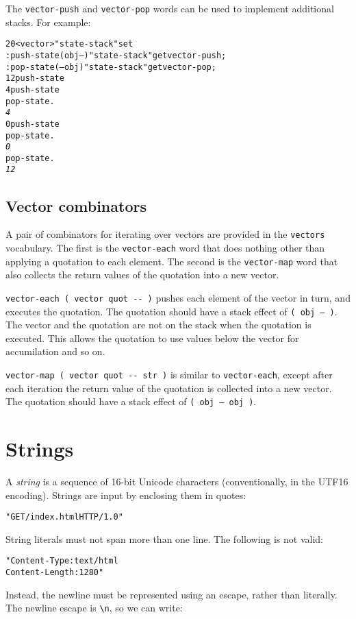 \documentclass[english]{article}
\begin{document}
The \texttt{vector-push} and \texttt{vector-pop} words can be used to implement additional stacks. For example:

\begin{alltt}
20 <vector> "state-stack" set
: push-state ( obj -- ) "state-stack" get vector-push ;
: pop-state ( -- obj ) "state-stack" get vector-pop ;
12 push-state
4 push-state
pop-state .
\emph{4}
0 push-state
pop-state .
\emph{0}
pop-state .
\emph{12}
\end{alltt}

\subsection{Vector combinators}

A pair of combinators for iterating over vectors are provided in the \texttt{vectors} vocabulary. The first is the \texttt{vector-each} word that does nothing other than applying a quotation to each element. The second is the \texttt{vector-map} word that also collects the return values of the quotation into a new vector.

\texttt{vector-each ( vector quot -{}- )} pushes each element of the vector in turn, and executes the quotation. The quotation should have a stack effect of \texttt{( obj -- )}. The vector and the quotation are not on the stack when the quotation is executed. This allows the quotation to use values below the vector for accumilation and so on.

\texttt{vector-map ( vector quot -{}- str )} is similar to \texttt{vector-each}, except after each iteration the return value of the quotation is collected into a new vector. The quotation should have a stack effect of \texttt{( obj -- obj )}.

\section{Strings}

A \emph{string} is a sequence of 16-bit Unicode characters (conventionally,
in the UTF16 encoding). Strings are input by enclosing them in quotes:

\begin{alltt}
"GET /index.html HTTP/1.0"
\end{alltt}
String literals must not span more than one line. The following is
not valid:

\begin{alltt}
"Content-Type: text/html
Content-Length: 1280"
\end{alltt}
Instead, the newline must be represented using an escape, rather than
literally. The newline escape is \texttt{\textbackslash{}n}, so we
can write:
\end{document}
